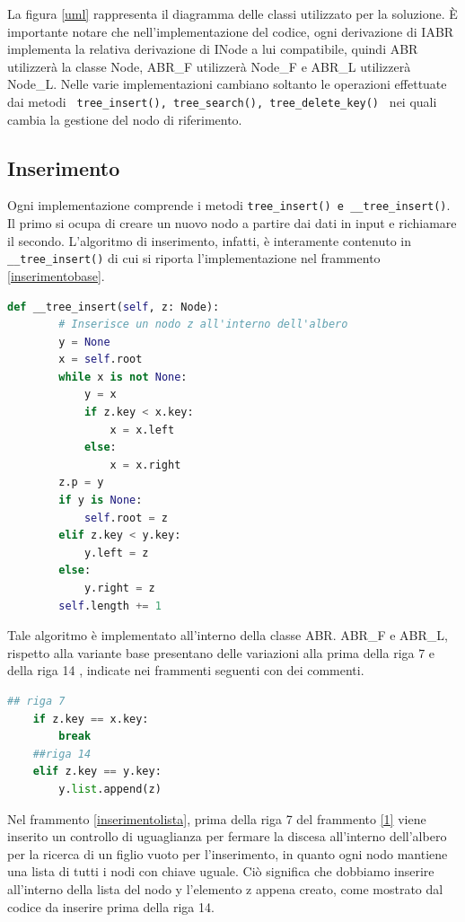 \documentclass{article}
\begin{document}
La figura \ref{uml} rappresenta il diagramma delle classi utilizzato per la soluzione. È importante notare che nell'implementazione del codice, ogni derivazione di IABR implementa la relativa derivazione di INode a lui compatibile, quindi ABR utilizzerà la classe Node, ABR\_F utilizzerà Node\_F e ABR\_L utilizzerà Node\_L. Nelle varie implementazioni cambiano soltanto le operazioni effettuate dai metodi \verb| tree_insert(), tree_search(), tree_delete_key() | nei quali cambia la gestione del nodo di riferimento.
\subsection{Inserimento}
Ogni implementazione comprende i metodi \verb|tree_insert() e __tree_insert()|.
Il primo si ocupa di creare un nuovo nodo a partire dai dati in input e richiamare il secondo.
L'algoritmo di inserimento, infatti, è interamente contenuto in \verb|__tree_insert()| di cui si riporta l'implementazione nel frammento \ref{inserimentobase}. \newpage

\begin{lstlisting}[language=Python, caption={Algoritmo di inserimento base}, label=inserimentobase]
    def __tree_insert(self, z: Node):
        # Inserisce un nodo z all'interno dell'albero
        y = None
        x = self.root
        while x is not None:
            y = x
            if z.key < x.key:
                x = x.left
            else:
                x = x.right
        z.p = y
        if y is None:
            self.root = z
        elif z.key < y.key:
            y.left = z
        else:
            y.right = z
        self.length += 1
\end{lstlisting}

Tale algoritmo è implementato all'interno della classe ABR.
ABR\_F e ABR\_L, rispetto alla variante base presentano delle variazioni alla prima della riga 7 e della riga 14 , indicate nei frammenti seguenti con dei commenti.

\begin{lstlisting}[language=Python, caption={Algoritmo di inserimento nell'implementazione con Lista}, label=inserimentolista]
    ## riga 7
    if z.key == x.key:
        break
    ##riga 14
    elif z.key == y.key:
        y.list.append(z)
\end{lstlisting}

Nel frammento \ref{inserimentolista}, prima della riga 7 del frammento \ref{1} viene inserito un controllo di uguaglianza per fermare la discesa all'interno dell'albero per la ricerca  di un figlio vuoto per l'inserimento, in quanto ogni nodo mantiene una lista di tutti i nodi con chiave uguale. Ciò significa che dobbiamo inserire all'interno della lista del nodo y l'elemento z appena creato, come mostrato dal codice da inserire prima della riga 14.
\end{document}

